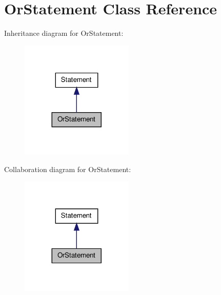 \hypertarget{class_or_statement}{\section{Or\-Statement Class Reference}
\label{class_or_statement}
}


Inheritance diagram for Or\-Statement\-:
\nopagebreak
\begin{figure}[H]
\begin{center}
\leavevmode
\includegraphics[width=152pt]{class_or_statement__inherit__graph}
\end{center}
\end{figure}


Collaboration diagram for Or\-Statement\-:
\nopagebreak
\begin{figure}[H]
\begin{center}
\leavevmode
\includegraphics[width=152pt]{class_or_statement__coll__graph}
\end{center}
\end{figure}

